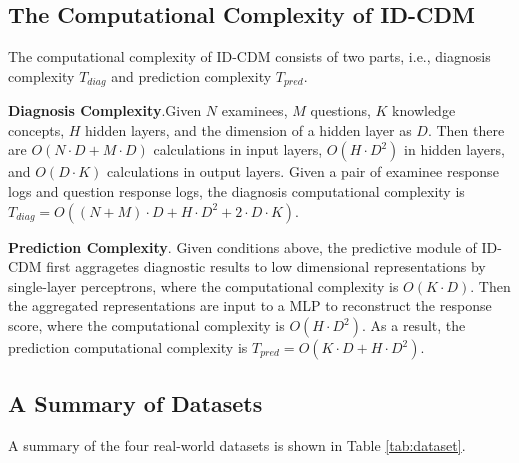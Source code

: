 \documentclass[sigconf]{acmart}
\begin{document}
\subsection{The Computational Complexity of ID-CDM}\label{sec:complexity} 
\par The computational complexity of ID-CDM consists of two parts, i.e., diagnosis complexity $T_{diag}$ and prediction complexity $T_{pred}$. 
\noindent\par \textbf{Diagnosis Complexity}.Given $N$ examinees, $M$ questions, $K$ knowledge concepts, $H$ hidden layers, and the dimension of a hidden layer as $D$. Then there are $O(N\cdot D + M\cdot D)$ calculations in input layers, $O(H\cdot D^2)$ in hidden layers, and $O(D\cdot K)$ calculations in output layers. Given a pair of examinee response logs and question response logs, the diagnosis computational complexity is $T_{diag}=O((N+M)\cdot D + H\cdot D^2 + 2\cdot D\cdot K)$.
\noindent\par \textbf{Prediction Complexity}. Given conditions above, the predictive module of ID-CDM first aggragetes diagnostic results to low dimensional representations by single-layer perceptrons, where the computational complexity is $O(K\cdot D)$. Then the aggregated representations are input to a MLP to reconstruct the response score, where the computational complexity is $O(H\cdot D^2)$. As a result, the prediction computational complexity is $T_{pred} = O(K\cdot D + H\cdot D^2)$.


\subsection{A Summary of Datasets}\label{app:data}
\par A summary of the four real-world datasets is shown in Table \ref{tab:dataset}.
\end{document}
